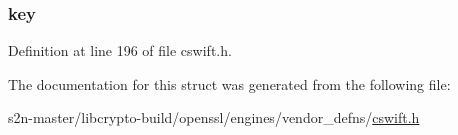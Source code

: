 \subsubsection[{\texorpdfstring{key}{key}}]{ key}\hypertarget{struct___s_w___d_s_a_a8e86c13d40d9291b46e5a335bee60d84}{}\label{struct___s_w___d_s_a_a8e86c13d40d9291b46e5a335bee60d84}


Definition at line 196 of file cswift.\+h.



The documentation for this struct was generated from the following file\+:\begin{DoxyCompactItemize}
\item 
s2n-\/master/libcrypto-\/build/openssl/engines/vendor\+\_\+defns/\hyperlink{cswift_8h}{cswift.\+h}\end{DoxyCompactItemize}
